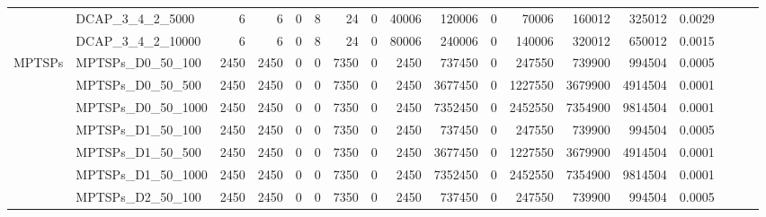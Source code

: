 \begin{table}[h]
{\begin{tabular}{llrrrrrrrrrrrrrlll}
			& DCAP\_3\_4\_2\_5000          & 6            & 6           & 0          & 8            & 24          & 0          & 40006   & 120006   & 0      & 70006   & 160012   & 325012     & 0.0029    &                          &                          &                          \\
			& DCAP\_3\_4\_2\_10000         & 6            & 6           & 0          & 8            & 24          & 0          & 80006   & 240006   & 0      & 140006  & 320012   & 650012     & 0.0015    &                          &                          &                          \\ \hline
			\multirow{24}{*}{MPTSPs}    & MPTSPs\_D0\_50\_100          & 2450         & 2450        & 0          & 0            & 7350        & 0          & 2450    & 737450   & 0      & 247550  & 739900   & 994504     & 0.0005    &                          &                          &                          \\
			& MPTSPs\_D0\_50\_500          & 2450         & 2450        & 0          & 0            & 7350        & 0          & 2450    & 3677450  & 0      & 1227550 & 3679900  & 4914504    & 0.0001    &                          &                          &                          \\
			& MPTSPs\_D0\_50\_1000         & 2450         & 2450        & 0          & 0            & 7350        & 0          & 2450    & 7352450  & 0      & 2452550 & 7354900  & 9814504    & 0.0001    &                          &                          &                          \\
			& MPTSPs\_D1\_50\_100          & 2450         & 2450        & 0          & 0            & 7350        & 0          & 2450    & 737450   & 0      & 247550  & 739900   & 994504     & 0.0005    &                          &                          &                          \\
			& MPTSPs\_D1\_50\_500          & 2450         & 2450        & 0          & 0            & 7350        & 0          & 2450    & 3677450  & 0      & 1227550 & 3679900  & 4914504    & 0.0001    &                          &                          &                          \\
			& MPTSPs\_D1\_50\_1000         & 2450         & 2450        & 0          & 0            & 7350        & 0          & 2450    & 7352450  & 0      & 2452550 & 7354900  & 9814504    & 0.0001    &                          &                          &                          \\
			& MPTSPs\_D2\_50\_100          & 2450         & 2450        & 0          & 0            & 7350        & 0          & 2450    & 737450   & 0      & 247550  & 739900   & 994504     & 0.0005    &                          &                          &                          \\

\end{tabular}}
\end{table}
